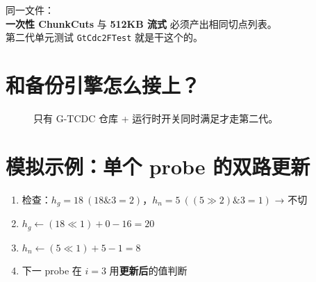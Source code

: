\begin{stepbox}
同一文件：\\
\textbf{一次性 ChunkCuts} 与 \textbf{512KB 流式} 必须产出相同切点列表。\\
第二代单元测试 \texttt{GtCdc2FTest} 就是干这个的。
\end{stepbox}

\section{和备份引擎怎么接上？}

\begin{figure}[htbp]
\centering
{}
\caption{只有 G-TCDC 仓库 + 运行时开关同时满足才走第二代。}
\end{figure}

\section{模拟示例：单个 probe 的双路更新}

\begin{simbox}[$i=2$ 未切，执行滚动]
\begin{enumerate}[nosep]
  \item 检查：$h_g=18\ (18\&3=2)$，$h_n=5\ ((5\!\gg\!2)\&3=1)$ → 不切
  \item $h_g \leftarrow (18 \ll 1)+0-16 = 20$
  \item $h_n \leftarrow (5 \ll 1)+5-1 = 8$
  \item 下一 probe 在 $i=3$ 用\textbf{更新后}的值判断
\end{enumerate}
\end{simbox}
